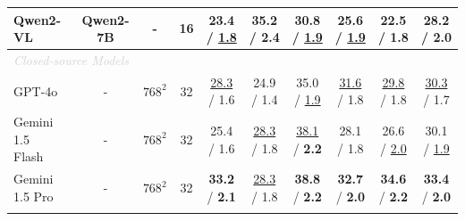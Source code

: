 \begin{table}[t]
{\begin{threeparttable}
\begin{tabular}{l|c|c|c|ccccc|c}
Qwen2-VL~\cite{wang2024qwen2} & Qwen2-7B & -  & 16  & 23.4 / \underline{1.8} & \textbf{35.2} / \textbf{2.4}  & 30.8 / \underline{1.9} & 25.6 / \underline{1.9} & 22.5 / 1.8  & 28.2 / \textbf{2.0} \\
\hline
\multicolumn{10}{l}{{\emph{\textcolor{lightgray}{Closed-source Models}}}} \\
GPT-4o~\cite{achiam2023gpt}  & - & $768^{2}$ & 32  & \underline{28.3} / {1.6}  & 24.9 / 1.4  & 35.0 / \underline{1.9}  & \underline{31.6} / 1.8 & \underline{29.8} / 1.8 & \underline{30.3} / 1.7   \\
Gemini 1.5 Flash~\cite{reid2024gemini} & - & $768^{2}$ & 32 & 25.4 / 1.6 & \underline{28.3} / {1.8} &  \underline{38.1} / \textbf{2.2} &  28.1 / {1.8} & 26.6 / \underline{2.0} &  30.1 / \underline{1.9} \\
Gemini 1.5 Pro~\cite{reid2024gemini}  & - & $768^{2}$ & 32  & \textbf{33.2} / \textbf{2.1} &  \underline{28.3} / {1.8} &  \textbf{38.8} / \textbf{2.2} & \textbf{32.7} / \textbf{2.0}  & \textbf{34.6} / \textbf{2.2}  &  \textbf{33.4} / \textbf{2.0}  \\
\Xhline{1pt}
\end{tabular}
\vspace{-0.5cm}
\end{threeparttable}}
\end{table}
